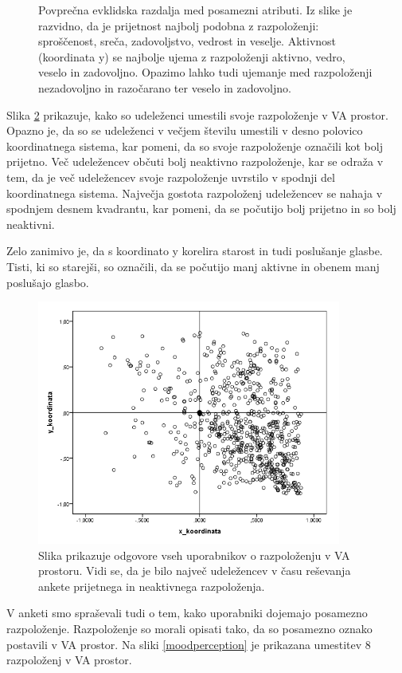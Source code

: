 \documentclass[a4paper, 12pt]{book}
\begin{document}
{\begin{figure}[hbt]
\caption{Povprečna evklidska razdalja med posamezni atributi. Iz slike je razvidno, da je prijetnost najbolj podobna z razpoloženji: sproščenost, sreča, zadovoljstvo, vedrost in veselje. Aktivnost (koordinata y) se najbolje ujema z razpoloženji aktivno, vedro, veselo in zadovoljno. Opazimo lahko tudi ujemanje med razpoloženji nezadovoljno in razočarano ter veselo in zadovoljno.}
\label{prisotnost_kor}
\end{figure}

Slika \ref{razpolozenjeva} prikazuje, kako so udeleženci umestili svoje razpoloženje v VA prostor. Opazno je, da so se udeleženci v večjem številu umestili v desno polovico koordinatnega sistema, kar pomeni, da so svoje razpoloženje označili kot bolj prijetno. Več udeležencev občuti bolj neaktivno razpoloženje, kar se odraža v tem, da je več udeležencev svoje razpoloženje uvrstilo v spodnji del koordinatnega sistema. Največja gostota razpoloženj udeležencev se nahaja v spodnjem desnem kvadrantu, kar pomeni, da se počutijo bolj prijetno in so bolj neaktivni. 

Zelo zanimivo je, da s koordinato y korelira starost in tudi poslušanje glasbe. Tisti, ki so starejši, so označili, da se počutijo manj aktivne in obenem manj poslušajo glasbo. 

\begin{figure}[hbt]
\centering
\includegraphics[width=10cm]{images/vamood.png}

\caption{Slika prikazuje odgovore vseh uporabnikov o razpoloženju v VA prostoru. Vidi se, da je bilo največ udeležencev v času reševanja ankete prijetnega in neaktivnega razpoloženja.  }
\label{razpolozenjeva}
\end{figure}

V anketi smo spraševali tudi o tem, kako uporabniki dojemajo posamezno razpoloženje. Razpoloženje so morali opisati tako, da so posamezno oznako postavili v VA prostor. Na sliki \ref{moodperception} je prikazana umestitev 8 razpoloženj v VA prostor. 

}
\end{document}
